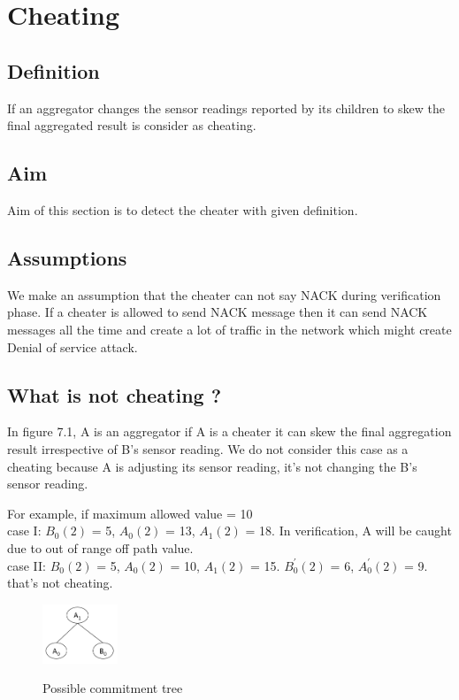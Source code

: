 \chapter{Cheating}

\section{Definition}
If an aggregator changes the sensor readings reported by its children to skew the final aggregated result is consider as cheating.

\section{Aim}
Aim of this section is to detect the cheater with given definition. 

\section{Assumptions}
We make an assumption that the cheater can not say NACK during verification phase. If a cheater is allowed to send NACK message then it can send NACK messages all the time and create a lot of traffic in the network which might create Denial of service attack. 

\section{What is not cheating ?}
	
	In figure 7.1, A is an aggregator if A is a cheater it can skew the final aggregation result irrespective of B's sensor reading. We do not consider this case as a cheating because A is adjusting its sensor reading, it's not changing the B's sensor reading. 
  
	For example, if maximum allowed value = 10\\
  
  case I: $B_{0}(2)$ = 5, $A_{0}(2)$ = 13, $A_{1}(2)$ = 18. In verification, A will be caught due to out of range off path value.\\

  case II: $B_{0}(2)$ = 5, $A_{0}(2)$ = 10, $A_{1}(2)$ = 15. $B_{0}^{'}(2)$ = 6, $A_{0}^{'}(2)$ = 9. that's not cheating.\\ 

	\begin{figure}[t]
		\centering
			\includegraphics[width=0.2\textwidth]{images/commitment_tree_1.png}\\
			\caption{Possible commitment tree}
	\end{figure}

